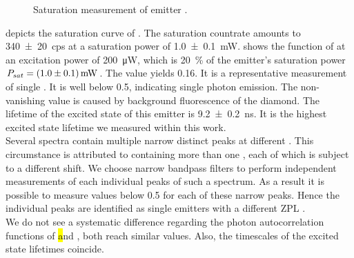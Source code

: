 		
		\begin{figure}[htp]
			\centering
			\caption{Saturation measurement of emitter \embroad.}
			\label{fig::sat_Ir8}
		\end{figure}

		 depicts the saturation curve of \embroad.
		The saturation countrate amounts to \SI[separate-uncertainty]{340\pm20}{cps} at a saturation power of \SI[separate-uncertainty]{1.0\pm0.1}{mW}.
		 shows the \gt function of \embroad at an excitation power of \SI{200}{\micro\W}, which is \SI{20}{\percent} of the emitter's saturation power $P_{sat}=\SI[separate-uncertainty]{1.0\pm0.1}{mW}$.
		The \gtz value yields \num{0.16}.
		It is a representative \gt measurement of single \sivs.
		It is well below \num{0.5}, indicating single photon emission.
		The non-vanishing \gtz value is caused by background fluorescence of the diamond.
		The lifetime of the excited state of this emitter is \SI[separate-uncertainty]{9.2\pm0.2}{ns}.
		It is the highest excited state lifetime we measured within this work.
		\\
		Several \nd \pl spectra contain multiple narrow distinct peaks at different \wls.
		This circumstance is attributed to \nds containing more than one \siv, each of which is subject to a different \ZPL \wl shift.
		We choose narrow bandpass filters to perform independent measurements of each individual peaks of such a spectrum.
		As a result it is possible to measure \gtz values below \num{0.5} for each of these narrow peaks.
		Hence the individual peaks are identified as single emitters with a different ZPL \cwl.
		\\
		We do not see a systematic difference regarding the photon autocorrelation functions of \hl and \vl, both reach similar \gtz values.
		Also, the timescales of the excited state lifetimes coincide.
